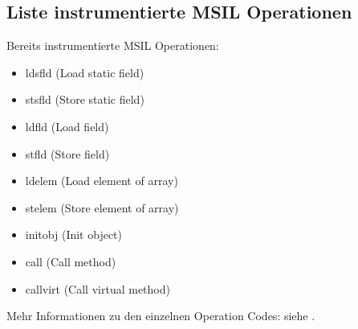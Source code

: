 \documentclass[10pt,a4paper]{article}
\begin{document}
\subsection*{Liste instrumentierte MSIL Operationen}
Bereits instrumentierte MSIL Operationen:
\begin{itemize}
\setlength\itemsep{0em}
\item ldsfld (Load static field)
\item stsfld (Store static field)
\item ldfld (Load field)
\item stfld (Store field)
\item ldelem (Load element of array)
\item stelem (Store element of array)
\item initobj (Init object)
\item call (Call method)
\item callvirt (Call virtual method)
\end{itemize}
Mehr Informationen zu den einzelnen Operation Codes: siehe \cite{ecma}.
\end{document}
